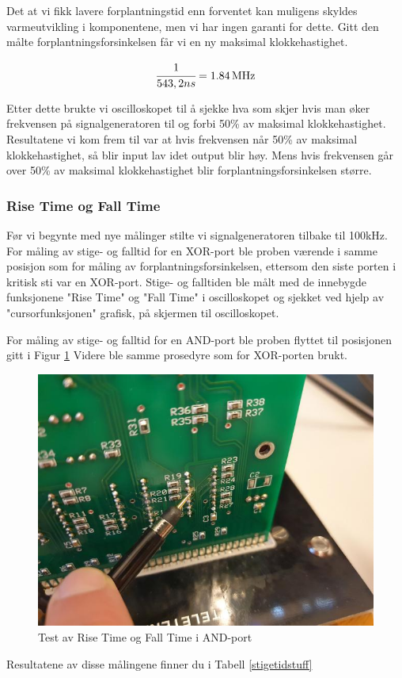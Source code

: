 Det at vi fikk lavere forplantningstid enn forventet kan muligens skyldes varmeutvikling i komponentene, men vi har ingen garanti for dette.
Gitt den målte forplantningsforsinkelsen får vi en ny maksimal klokkehastighet.

\begin{displaymath}
  \cfrac{1}{543,2ns}=\SI{1,84}{\mega\hertz}
\end{displaymath}

Etter dette brukte vi oscilloskopet til å sjekke hva som skjer hvis man øker frekvensen på signalgeneratoren til og forbi 50\% av maksimal klokkehastighet.
Resultatene vi kom frem til var at hvis frekvensen når 50\% av maksimal klokkehastighet, så blir input lav idet output blir høy.
Mens hvis frekvensen går over 50\% av maksimal klokkehastighet blir forplantningsforsinkelsen større.

\subsubsection*{Rise Time og Fall Time}

Før vi begynte med nye målinger stilte vi signalgeneratoren tilbake til 100kHz.
For måling av stige- og falltid for en XOR-port ble proben værende i samme posisjon som for måling av forplantningsforsinkelsen, ettersom den siste porten i kritisk sti var en XOR-port.
Stige- og falltiden ble målt med de innebygde funksjonene "Rise Time" og "Fall Time" i oscilloskopet og sjekket ved hjelp av "cursorfunksjonen" grafisk, på skjermen til oscilloskopet.

For måling av stige- og falltid for en AND-port ble proben flyttet til posisjonen gitt i Figur \ref{figur:3}
Videre ble samme prosedyre som for XOR-porten brukt.

\begin{figure}[h]
  \includegraphics{Bilder/Probetest2}
  \caption{Test av Rise Time og Fall Time i AND-port}
  \label{figur:3}
\end{figure}

Resultatene av disse målingene finner du i Tabell \ref{stigetidstuff}
